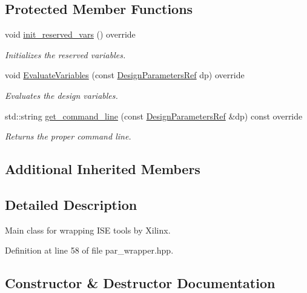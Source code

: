 \subsection*{Protected Member Functions}
\begin{DoxyCompactItemize}
\item 
void \hyperlink{classpar__wrapper_a25c7424ba2105125054cad920450bc6e}{init\+\_\+reserved\+\_\+vars} () override
\begin{DoxyCompactList}\small\item\em Initializes the reserved variables. \end{DoxyCompactList}\item 
void \hyperlink{classpar__wrapper_a9713765d1906b815c3eb4d84804fdc85}{Evaluate\+Variables} (const \hyperlink{DesignParameters_8hpp_ae36bb1c4c9150d0eeecfe1f96f42d157}{Design\+Parameters\+Ref} dp) override
\begin{DoxyCompactList}\small\item\em Evaluates the design variables. \end{DoxyCompactList}\item 
std\+::string \hyperlink{classpar__wrapper_aee784dea142fbce12724b9da547d4e9f}{get\+\_\+command\+\_\+line} (const \hyperlink{DesignParameters_8hpp_ae36bb1c4c9150d0eeecfe1f96f42d157}{Design\+Parameters\+Ref} \&dp) const override
\begin{DoxyCompactList}\small\item\em Returns the proper command line. \end{DoxyCompactList}\end{DoxyCompactItemize}
\subsection*{Additional Inherited Members}


\subsection{Detailed Description}
Main class for wrapping I\+SE tools by Xilinx. 

Definition at line 58 of file par\+\_\+wrapper.\+hpp.



\subsection{Constructor \& Destructor Documentation}
\mbox{\label{classpar__wrapper_abad8d571d4ce4a40e6812fa788f38613}} 
